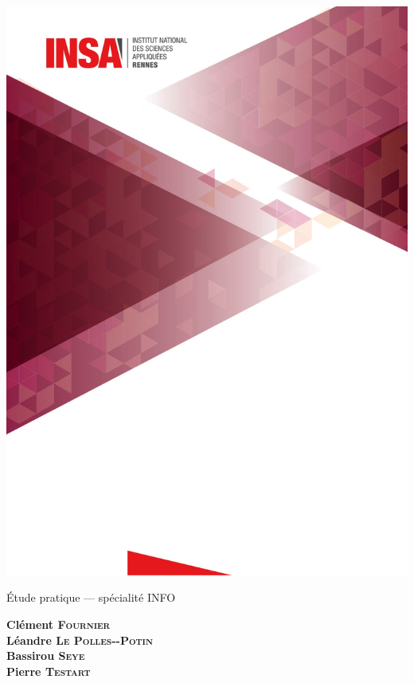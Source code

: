 

\def\name#1#2{
	{\color{white}\Large \bfseries #1 \textsc{#2}}\\[3mm]
    }

\hspace{-0.75cm}
\begin{minipage}{21cm}

  \noindent \includegraphics[width=21cm]{NE_PAS_TOUCHER/pfe-insa-page1.png}

  \vspace{-27.6cm}
  \hspace{12cm}\begin{minipage}{8cm}
    \begin{flushright}

      {\color{white}\large Étude pratique --- spécialité INFO}

      \vspace{7mm}
      \name{Clément}{Fournier}
      \name{Léandre}{Le Polles-{-}Potin}
      \name{Bassirou}{Seye}
      \name{Pierre}{Testart}

    \end{flushright}
  \end{minipage}
\end{minipage}

